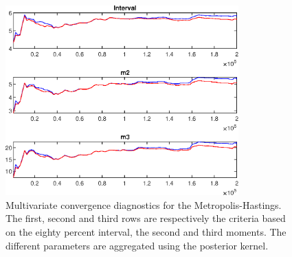  
\begin{figure}[H]
\centering 
\includegraphics[width=0.8\textwidth]{RBC_growth/Output/RBC_growth_mdiag}
\caption{Multivariate convergence diagnostics for the Metropolis-Hastings.
The first, second and third rows are respectively the criteria based on
the eighty percent interval, the second and third moments. The different 
parameters are aggregated using the posterior kernel.}\label{Fig:MultivariateDiagnostics}
\end{figure}

